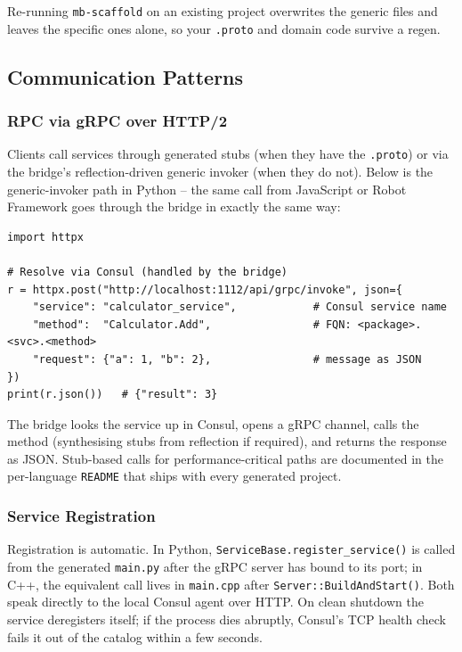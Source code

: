 \noindent
Re-running \texttt{mb-scaffold} on an existing project overwrites the generic files and
leaves the specific ones alone, so your \texttt{.proto} and domain code survive a
regen.

\subsection{Communication Patterns}

\subsubsection{RPC via gRPC over HTTP/2}

Clients call services through generated stubs (when they have the \texttt{.proto}) or
via the bridge's reflection-driven generic invoker (when they do not).  Below is the
generic-invoker path in Python -- the same call from JavaScript or Robot Framework goes
through the bridge in exactly the same way:

\begin{verbatim}
import httpx

# Resolve via Consul (handled by the bridge)
r = httpx.post("http://localhost:1112/api/grpc/invoke", json={
    "service": "calculator_service",            # Consul service name
    "method":  "Calculator.Add",                # FQN: <package>.<svc>.<method>
    "request": {"a": 1, "b": 2},                # message as JSON
})
print(r.json())   # {"result": 3}
\end{verbatim}

\noindent
The bridge looks the service up in Consul, opens a gRPC channel, calls the method
(synthesising stubs from reflection if required), and returns the response as JSON.
Stub-based calls for performance-critical paths are documented in the per-language
\texttt{README} that ships with every generated project.

\subsubsection{Service Registration}

Registration is automatic.  In Python, \texttt{ServiceBase.register\_service()} is
called from the generated \texttt{main.py} after the gRPC server has bound to its port;
in C++, the equivalent call lives in \texttt{main.cpp} after \texttt{Server::BuildAndStart()}.
Both speak directly to the local Consul agent over HTTP.  On clean shutdown the
service deregisters itself; if the process dies abruptly, Consul's TCP health check
fails it out of the catalog within a few seconds.

